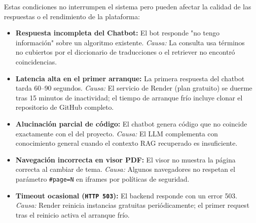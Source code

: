\documentclass[12pt, letterpaper]{article}
\begin{document}
	\begin{tcolorbox}[colback=lightgray, colframe=primary, title=\textbf{5.1 Advertencias Lógicas (Degradación de servicio)}]
		Estas condiciones no interrumpen el sistema pero pueden afectar la calidad de las respuestas o el rendimiento de la plataforma:
		\begin{itemize}
			\item \textbf{Respuesta incompleta del Chatbot:} El bot responde "no tengo información" sobre un algoritmo existente. \textit{Causa:} La consulta usa términos no cubiertos por el diccionario de traducciones o el retriever no encontró coincidencias.
			\item \textbf{Latencia alta en el primer arranque:} La primera respuesta del chatbot tarda 60–90 segundos. \textit{Causa:} El servicio de Render (plan gratuito) se duerme tras 15 minutos de inactividad; el tiempo de arranque frío incluye clonar el repositorio de GitHub completo.
			\item \textbf{Alucinación parcial de código:} El chatbot genera código que no coincide exactamente con el del proyecto. \textit{Causa:} El LLM complementa con conocimiento general cuando el contexto RAG recuperado es insuficiente.
			\item \textbf{Navegación incorrecta en visor PDF:} El visor no muestra la página correcta al cambiar de tema. \textit{Causa:} Algunos navegadores no respetan el parámetro \texttt{\#page=N} en iframes por políticas de seguridad.
			\item \textbf{Timeout ocasional (\texttt{HTTP 503}):} El backend responde con un error 503. \textit{Causa:} Render reinicia instancias gratuitas periódicamente; el primer request tras el reinicio activa el arranque frío.
		\end{itemize}
	\end{tcolorbox}
	
\end{document}
